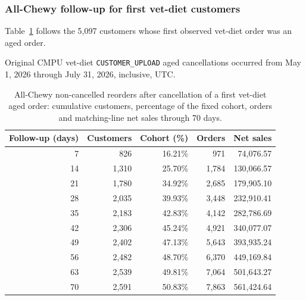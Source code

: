 \clearpage
\subsubsection{All-Chewy follow-up for first vet-diet customers}
Table~\ref{tab:financial-opportunity-new-vet-diet-all-chewy} follows the
5,097 customers whose first observed vet-diet order was an aged order.

Original CMPU vet-diet
\texttt{CUSTOMER\_UPLOAD} aged cancellations occurred from
May 1, 2026 through July 31, 2026, inclusive, UTC.

\begin{table}[!htbp]
\centering
\caption{All-Chewy non-cancelled reorders after cancellation of a first vet-diet aged order: cumulative customers, percentage of the fixed cohort, orders and matching-line net sales through 70 days.}
\label{tab:financial-opportunity-new-vet-diet-all-chewy}
\begin{tabular}{@{}rrrrr@{}}
\toprule
Follow-up (days) & Customers & Cohort (\%) & Orders & Net sales \\
\midrule
7 & 826 & 16.21\% & 971 & 74,076.57 \\
14 & 1,310 & 25.70\% & 1,784 & 130,066.57 \\
21 & 1,780 & 34.92\% & 2,685 & 179,905.10 \\
28 & 2,035 & 39.93\% & 3,448 & 232,910.41 \\
35 & 2,183 & 42.83\% & 4,142 & 282,786.69 \\
42 & 2,306 & 45.24\% & 4,921 & 340,077.07 \\
49 & 2,402 & 47.13\% & 5,643 & 393,935.24 \\
56 & 2,482 & 48.70\% & 6,370 & 449,169.84 \\
63 & 2,539 & 49.81\% & 7,064 & 501,643.27 \\
70 & 2,591 & 50.83\% & 7,863 & 561,424.64 \\
\bottomrule
\end{tabular}


\end{table}
